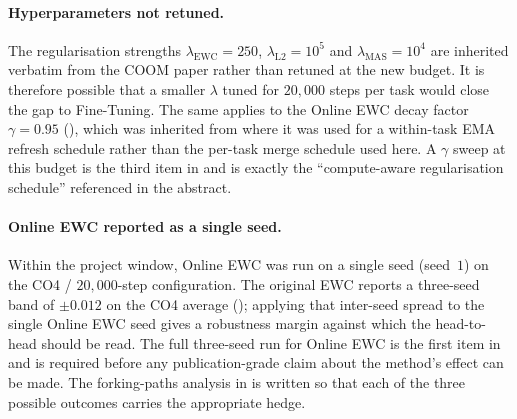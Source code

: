 \paragraph{Hyperparameters not retuned.}
The regularisation strengths $\lambda_{\text{EWC}}=250$,
$\lambda_{\text{L2}}=10^{5}$ and $\lambda_{\text{MAS}}=10^{4}$
are inherited verbatim from the COOM paper rather than retuned
at the new budget. It is therefore possible that a smaller
$\lambda$ tuned for $20{,}000$ steps per task would close the
gap to Fine-Tuning. The same applies to the Online EWC decay
factor $\gamma = 0.95$ (), which was
inherited from \citet{schwarz2018progress} where it was used
for a within-task EMA refresh schedule rather than the
per-task merge schedule used here. A $\gamma$ sweep at this
budget is the third item in  and is exactly
the ``compute-aware regularisation schedule'' referenced in
the abstract.

\paragraph{Online EWC reported as a single seed.}
Within the project window, Online EWC was run on a single
seed (seed~$1$) on the CO4 / $20{,}000$-step configuration.
The original EWC reports a three-seed band of ${\pm}0.012$ on
the CO4 average (); applying that
inter-seed spread to the single Online EWC seed gives a
robustness margin against which the head-to-head should be
read. The full three-seed run for Online EWC is the first
item in  and is required before any
publication-grade claim about the method's effect can be
made. The forking-paths analysis in  is
written so that each of the three possible outcomes carries
the appropriate hedge.
